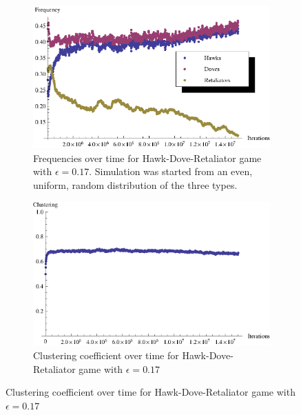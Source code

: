 \documentclass[12pt]{amsart}
\begin{document}
\begin{figure}[ht]
	\begin{subfigure}[b]{0.3\textwidth}
		\includegraphics[width = \textwidth]{Diagrams/HDR/HD_slow_freqs}
		\caption{Frequencies over time for Hawk-Dove-Retaliator game with $\epsilon = 0.17$. 			Simulation was started from an even, uniform, random distribution of the three types.}
		\label{fig:HDR_HDwin_freqs_slow}
	\end{subfigure}
	
	\begin{subfigure}[b]{0.3\textwidth}
		\includegraphics[width = \textwidth]{Diagrams/HDR/HD_slow_clust}
		\caption{Clustering coefficient over time for Hawk-Dove-Retaliator game with $\epsilon = 		0.17$}
			\label{fig:HDR_HDwin_clustering_slow}
	\end{subfigure}
	


\end{figure}
\end{document}
